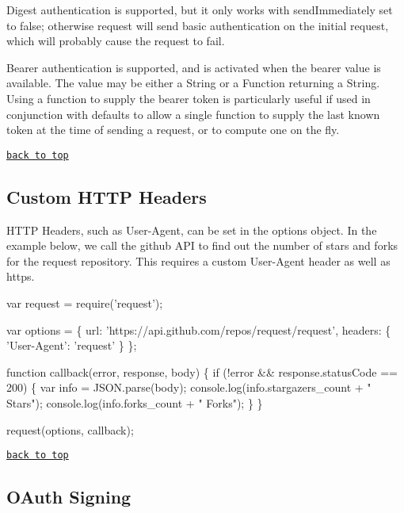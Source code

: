 Digest authentication is supported, but it only works with {\ttfamily send\+Immediately} set to {\ttfamily false}; otherwise {\ttfamily request} will send basic authentication on the initial request, which will probably cause the request to fail.

Bearer authentication is supported, and is activated when the {\ttfamily bearer} value is available. The value may be either a {\ttfamily String} or a {\ttfamily Function} returning a {\ttfamily String}. Using a function to supply the bearer token is particularly useful if used in conjunction with {\ttfamily defaults} to allow a single function to supply the last known token at the time of sending a request, or to compute one on the fly.

\href{#table-of-contents}{\tt back to top}





\subsection*{Custom H\+T\+TP Headers}

H\+T\+TP Headers, such as {\ttfamily User-\/\+Agent}, can be set in the {\ttfamily options} object. In the example below, we call the github A\+PI to find out the number of stars and forks for the request repository. This requires a custom {\ttfamily User-\/\+Agent} header as well as https.


\begin{DoxyCode}
var request = require('request');

var options = \{
  url: 'https://api.github.com/repos/request/request',
  headers: \{
    'User-Agent': 'request'
  \}
\};

function callback(error, response, body) \{
  if (!error && response.statusCode == 200) \{
    var info = JSON.parse(body);
    console.log(info.stargazers\_count + " Stars");
    console.log(info.forks\_count + " Forks");
  \}
\}

request(options, callback);
\end{DoxyCode}


\href{#table-of-contents}{\tt back to top}





\subsection*{O\+Auth Signing}

